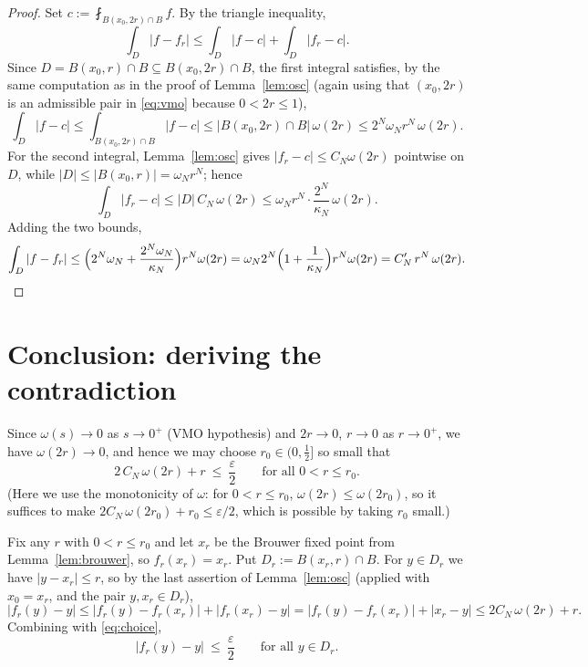 \documentclass{amsart}
\theoremstyle{definition}
\begin{document}
\begin{proof}
Set $c:=\fint_{B(x_0,2r)\cap B}f$. By the triangle inequality,
\[
\int_{D}|f-f_r|\le\int_{D}|f-c|+\int_{D}|f_r-c|.
\]
Since $D=B(x_0,r)\cap B\subseteq B(x_0,2r)\cap B$, the first integral satisfies, by
the same computation as in the proof of Lemma~\ref{lem:osc} (again using that
$(x_0,2r)$ is an admissible pair in \eqref{eq:vmo} because $0<2r\le1$),
\[
\int_{D}|f-c|\le\int_{B(x_0,2r)\cap B}|f-c|\le |B(x_0,2r)\cap B|\,\omega(2r)
\le 2^N\omega_N r^N\,\omega(2r).
\]
For the second integral, Lemma~\ref{lem:osc} gives $|f_r-c|\le C_N\omega(2r)$
pointwise on $D$, while $|D|\le|B(x_0,r)|=\omega_N r^N$; hence
\[
\int_{D}|f_r-c|\le |D|\,C_N\,\omega(2r)\le \omega_N r^N\cdot\frac{2^N}{\kappa_N}\,\omega(2r).
\]
Adding the two bounds,
\[
\int_{D}|f-f_r|\le\Bigl(2^N\omega_N+\frac{2^N\omega_N}{\kappa_N}\Bigr)r^N\omega(2r)
=\omega_N 2^N\Bigl(1+\frac1{\kappa_N}\Bigr)r^N\omega(2r)=C'_N\,r^N\,\omega(2r). \qedhere
\]
\end{proof}

\section{Conclusion: deriving the contradiction}

Since $\omega(s)\to0$ as $s\to0^+$ (VMO hypothesis) and $2r\to0$, $r\to0$ as
$r\to0^+$, we have $\omega(2r)\to0$, and hence we may choose $r_0\in(0,\tfrac12]$
so small that
\begin{equation}\label{eq:choice}
2\,C_N\,\omega(2r)+r\ \le\ \frac{\varepsilon}{2}\qquad\text{for all }0<r\le r_0 .
\end{equation}
(Here we use the monotonicity of $\omega$: for $0<r\le r_0$, $\omega(2r)\le\omega(2r_0)$,
so it suffices to make $2C_N\,\omega(2r_0)+r_0\le\varepsilon/2$, which is possible
by taking $r_0$ small.)

Fix any $r$ with $0<r\le r_0$ and let $x_r$ be the Brouwer fixed point from
Lemma~\ref{lem:brouwer}, so $f_r(x_r)=x_r$. Put $D_r:=B(x_r,r)\cap B$. For
$y\in D_r$ we have $|y-x_r|\le r$, so by the last assertion of Lemma~\ref{lem:osc}
(applied with $x_0=x_r$, and the pair $y,x_r\in D_r$),
\[
|f_r(y)-y|\le|f_r(y)-f_r(x_r)|+|f_r(x_r)-y|
=|f_r(y)-f_r(x_r)|+|x_r-y|
\le 2C_N\,\omega(2r)+r .
\]
Combining with \eqref{eq:choice},
\begin{equation}\label{eq:near}
|f_r(y)-y|\ \le\ \frac{\varepsilon}{2}\qquad\text{for all }y\in D_r .
\end{equation}
\end{document}
